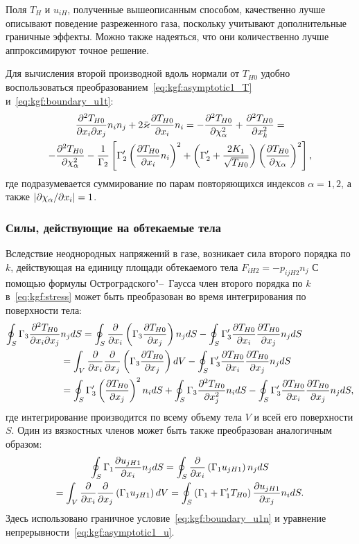 Поля \(T_H\) и \(u_{iH}\), полученные вышеописанным способом,
качественно лучше описывают поведение разреженного газа,
поскольку учитывают дополнительные граничные эффекты.
Можно также надеяться, что они количественно лучше аппроксимируют точное решение.

Для вычисления второй производной вдоль нормали от \(T_{H0}\)
удобно воспользоваться преобразованием~\eqref{eq:kgf:asymptotic1_T} и~\eqref{eq:kgf:boundary_u1t}:
\begin{multline*}
    \pderder[T_{H0}]{x_i}{x_j}n_i n_j + 2\bar\kappa\pder[T_{H0}]{x_i}n_i =
        - \pderdual[T_{H0}]{\chi_\alpha} + \pderdual[T_{H0}]{x_k} = \\
    - \pderdual[T_{H0}]{\chi_\alpha} - \frac1{\Gamma_2} \left[
        \Gamma_2'\left(\pder[T_{H0}]{x_i}n_i\right)^2 +
        \left(\Gamma_2'+\frac{2K_1}{\sqrt{T_{H0}}}\right) \left(\pder[T_{H0}]{\chi_\alpha}\right)^2
    \right],
\end{multline*}
где подразумевается суммирование по парам повторяющихся индексов \(\alpha=1,2\),
а также \(|\Pder[\chi_\alpha]{x_i}| = 1\).

\subsubsection{Силы, действующие на обтекаемые тела}

Вследствие неоднородных напряжений в газе, возникает сила второго порядка по \(k\),
действующая на единицу площади обтекаемого тела \(F_{iH2} = -p_{ijH2}n_j\)
С помощью формулы Остроградского"--~Гаусса член второго порядка по \(k\) в~\eqref{eq:kgf:stress}
может быть преобразован во время интегрирования по поверхности тела:
\begin{align*}
    \oint_S \Gamma_3\pderder[T_{H0}]{x_i}{x_j} &n_j\dd{S}
         = \oint_S \pder{x_i} \left( \Gamma_3\pder[T_{H0}]{x_j} \right) n_j\dd{S}
        - \oint_S \Gamma_3'\pder[T_{H0}]{x_i}\pder[T_{H0}]{x_j} n_j\dd{S} \\
        &= \int_V \pder{x_i}\pder{x_j} \left( \Gamma_3 \pder[T_{H0}]{x_j} \right) \dd{V}
        - \oint_S \Gamma_3'\pder[T_{H0}]{x_i}\pder[T_{H0}]{x_j} n_j\dd{S} \\
        &= \oint_S \Gamma_3'\left(\pder[T_{H0}]{x_j}\right)^2 n_i\dd{S}
        + \oint_S \Gamma_3\pderdual[T_{H0}]{x_j} n_i\dd{S}
        - \oint_S \Gamma_3'\pder[T_{H0}]{x_i}\pder[T_{H0}]{x_j} n_j\dd{S},
\end{align*}
где интегрирование производится по всему объему тела \(V\) и всей его поверхности \(S\).
Один из вязкостных членов может быть также преобразован аналогичным образом:
\begin{multline*}
    \oint_S \Gamma_1\pder[u_{jH1}]{x_i} n_j\dd{S}
        = \oint_S \pder{x_i} \left( \Gamma_1 u_{jH1} \right) n_j\dd{S} \\
        = \int_V \pder{x_i}\pder{x_j} \left( \Gamma_1 u_{jH1} \right) \dd{V}
        = \oint_S \left( \Gamma_1 + \Gamma_1'T_{H0} \right) \pder[u_{jH1}]{x_j} n_i\dd{S}.
\end{multline*}
Здесь использовано граничное условие~\eqref{eq:kgf:boundary_u1n} и уравнение непрерывности~\eqref{eq:kgf:asymptotic1_u}.

